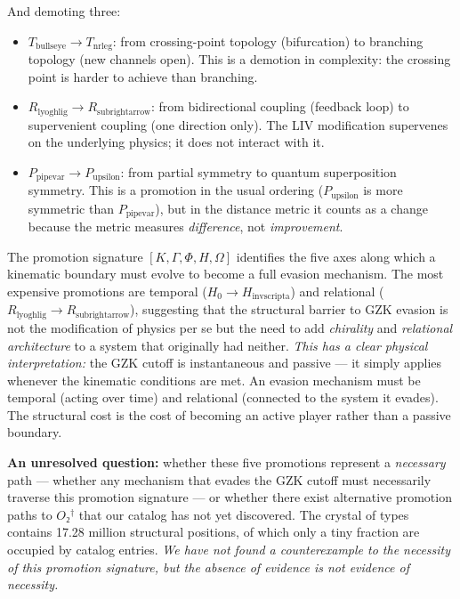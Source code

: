 \documentclass[12pt,a4paper]{article}
\begin{document}
And demoting three:

\begin{itemize}
    \item $T_{\text{bullseye}} \to T_{\text{nrleg}}$: from crossing-point topology (bifurcation) to branching topology (new channels open). This is a demotion in complexity: the crossing point is harder to achieve than branching.
    \item $R_{\text{lyoghlig}} \to R_{\text{subrightarrow}}$: from bidirectional coupling (feedback loop) to supervenient coupling (one direction only). The LIV modification supervenes on the underlying physics; it does not interact with it.
    \item $P_{\text{pipevar}} \to P_{\text{upsilon}}$: from partial symmetry to quantum superposition symmetry. This is a promotion in the usual ordering ($P_{\text{upsilon}}$ is more symmetric than $P_{\text{pipevar}}$), but in the distance metric it counts as a change because the metric measures \emph{difference}, not \emph{improvement}.
\end{itemize}

The promotion signature $[K, \Gamma, \Phi, H, \Omega]$ identifies the five axes along which a kinematic boundary must evolve to become a full evasion mechanism. The most expensive promotions are temporal ($H_0 \to H_{\text{invscripta}}$) and relational ($R_{\text{lyoghlig}} \to R_{\text{subrightarrow}}$), suggesting that the structural barrier to GZK evasion is not the modification of physics per se but the need to add \emph{chirality} and \emph{relational architecture} to a system that originally had neither. \emph{This has a clear physical interpretation:} the GZK cutoff is instantaneous and passive --- it simply applies whenever the kinematic conditions are met. An evasion mechanism must be temporal (acting over time) and relational (connected to the system it evades). The structural cost is the cost of becoming an active player rather than a passive boundary.

\textbf{An unresolved question:} whether these five promotions represent a \emph{necessary} path --- whether any mechanism that evades the GZK cutoff must necessarily traverse this promotion signature --- or whether there exist alternative promotion paths to $O₂^\dagger$ that our catalog has not yet discovered. The crystal of types contains 17.28 million structural positions, of which only a tiny fraction are occupied by catalog entries. \emph{We have not found a counterexample to the necessity of this promotion signature, but the absence of evidence is not evidence of necessity.}
\end{document}
